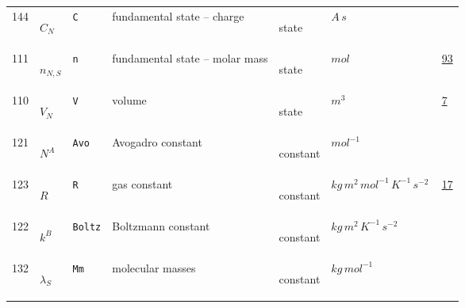 \begin{longtable}{|p{1cm}|p{2.5cm}|p{4.5cm}|p{8cm}|p{3.0cm}|p{3cm}|p{1cm}|}
            144
             & \hypertarget{"v:144"}{ $ {C}{_{N}} $}
             & \verb|C|
             & fundamental state -- charge
             & \begin{lay}state \end{lay}
             & $ A \,s \, $
             & \\
            111
             & \hypertarget{"v:111"}{ $ {n}{_{N, S}} $}
             & \verb|n|
             & fundamental state -- molar mass
             & \begin{lay}state \end{lay}
             & $ mol \, $
             &                 \hyperlink{"e:93"}{ 93 }
                 \\
            110
             & \hypertarget{"v:110"}{ $ {V}{_{N}} $}
             & \verb|V|
             & volume
             & \begin{lay}state \end{lay}
             & $ m^{3} \, $
             &                 \hyperlink{"e:7"}{ 7 }
                 \\
            121
             & \hypertarget{"v:121"}{ $ {{N^A}}{_{}} $}
             & \verb|Avo|
             & Avogadro constant
             & \begin{lay}constant \end{lay}
             & $ mol^{-1} \, $
             & \\
            123
             & \hypertarget{"v:123"}{ $ {R}{_{}} $}
             & \verb|R|
             & gas constant
             & \begin{lay}constant \end{lay}
             & $ kg \,m^{2} \,mol^{-1} \,K^{-1} \,s^{-2} \, $
             &                 \hyperlink{"e:17"}{ 17 }
                 \\
            122
             & \hypertarget{"v:122"}{ $ {{k^B}}{_{}} $}
             & \verb|Boltz|
             & Boltzmann constant
             & \begin{lay}constant \end{lay}
             & $ kg \,m^{2} \,K^{-1} \,s^{-2} \, $
             & \\
            132
             & \hypertarget{"v:132"}{ $ {{\lambda}}{_{S}} $}
             & \verb|Mm|
             & molecular masses
             & \begin{lay}constant \end{lay}
             & $ kg \,mol^{-1} \, $
             & \\

\end{longtable}
